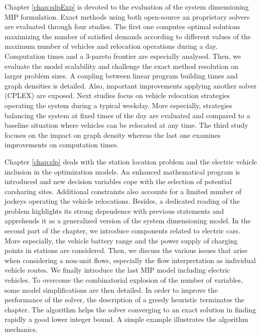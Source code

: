 \medskip
Chapter \ref{chap:sdpExp} is devoted to the evaluation of the system dimensioning MIP formulation.
Exact methods using both open-source an proprietary solvers are evaluated through four studies.
The first one computes optimal solutions maximizing the number of satisfied demands according to different values of the maximum number of vehicles and relocation operations during a day.
Computation times and a 3-pareto frontier are especially analysed.
Then, we evaluate the model scalability and challenge the exact method resolution on larger problem sizes.
A coupling between linear program building times and graph densities is detailed.
Also, important improvements applying another solver (CPLEX) are exposed.
Next studies focus on vehicle relocation strategies operating the system during a typical weekday.
More especially, strategies balancing the system at fixed times of the day are evaluated and compared to a baseline situation where vehicles can be relocated at any time.
The third study focuses on the impact on graph density whereas the last one examines improvements on computation times.


\medskip
Chapter \ref{chap:slp} deals with the station location problem and the electric vehicle inclusion in the optimization models.
An enhanced mathematical program is introduced and new decision variables cope with the selection of potential carsharing sites.
Additional constraints also accounts for a limited number of jockeys operating the vehicle relocations.
Besides, a dedicated reading of the problem highlights its strong dependence with previous statements and apprehends it as a generalized version of the system dimensioning model.
In the second part of the chapter, we introduce components related to electric cars.
More especially, the vehicle battery range and the power supply of charging points in stations are considered.
Then, we discuss the various issues that arise when considering a non-unit flows, especially the flow interpretation as individual vehicle routes.
We finally introduce the last MIP model including electric vehicles.
To overcome the combinatorial explosion of the number of variables, some model simplifications are then detailed.
In order to improve the performance of the solver, the description of a greedy heuristic terminates the chapter.
The algorithm helps the solver converging to an exact solution in finding rapidly a good lower integer bound.
A simple example illustrates the algorithm mechanics.



